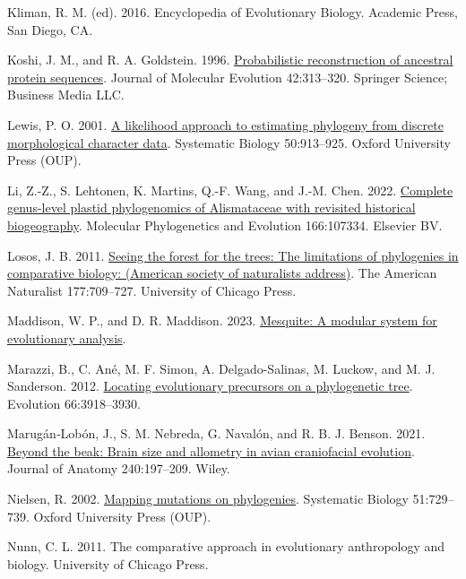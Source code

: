 \documentclass{article}
\newlength{\cslhangindent}
\newenvironment{CSLReferences}[2] %
 {\begin{list}{}{%
  \setlength{\itemindent}{0pt}
  \setlength{\leftmargin}{0pt}
  \setlength{\parsep}{0pt}
  \ifodd #1
   \setlength{\leftmargin}{\cslhangindent}
   \setlength{\itemindent}{-1\cslhangindent}
  \fi
  \setlength{\itemsep}{#2\baselineskip}}}
 {\end{list}}
\begin{document}
\begin{CSLReferences}{1}{0}
Kliman, R. M. (ed). 2016. {E}ncyclopedia of {E}volutionary {B}iology. Academic Press, San Diego, CA.

Koshi, J. M., and R. A. Goldstein. 1996. \href{https://doi.org/10.1007/bf02198858}{Probabilistic reconstruction of ancestral protein sequences}. Journal of Molecular Evolution 42:313--320. Springer Science; Business Media LLC.

Lewis, P. O. 2001. \href{https://doi.org/10.1080/106351501753462876}{A likelihood approach to estimating phylogeny from discrete morphological character data}. Systematic Biology 50:913--925. Oxford University Press (OUP).

Li, Z.-Z., S. Lehtonen, K. Martins, Q.-F. Wang, and J.-M. Chen. 2022. \href{https://doi.org/10.1016/j.ympev.2021.107334}{Complete genus-level plastid phylogenomics of {A}lismataceae with revisited historical biogeography}. Molecular Phylogenetics and Evolution 166:107334. Elsevier BV.

Losos, J. B. 2011. \href{https://doi.org/10.1086/660020}{Seeing the forest for the trees: The limitations of phylogenies in comparative biology: (American society of naturalists address)}. The American Naturalist 177:709--727. University of Chicago Press.

Maddison, W. P., and D. R. Maddison. 2023. \href{http://mesquiteproject.org}{Mesquite: A modular system for evolutionary analysis}.

Marazzi, B., C. Ané, M. F. Simon, A. Delgado-Salinas, M. Luckow, and M. J. Sanderson. 2012. \href{https://doi.org/10.1111/j.1558-5646.2012.01720.x}{Locating evolutionary precursors on a phylogenetic tree}. Evolution 66:3918--3930.

Marugán‐Lobón, J., S. M. Nebreda, G. Navalón, and R. B. J. Benson. 2021. \href{https://doi.org/10.1111/joa.13555}{Beyond the beak: Brain size and allometry in avian craniofacial evolution}. Journal of Anatomy 240:197--209. Wiley.

Nielsen, R. 2002. \href{https://doi.org/10.1080/10635150290102393}{Mapping mutations on phylogenies}. Systematic Biology 51:729--739. Oxford University Press (OUP).

Nunn, C. L. 2011. The comparative approach in evolutionary anthropology and biology. University of Chicago Press.


\end{CSLReferences}
\end{document}
